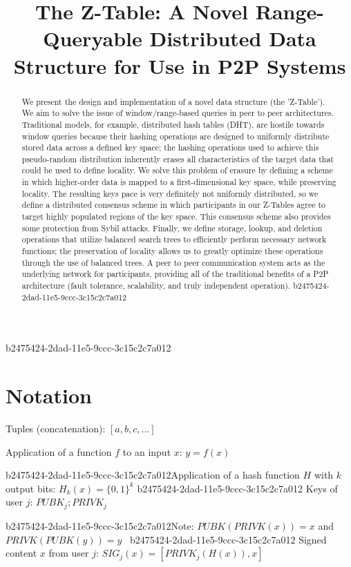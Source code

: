 \documentclass[12pt]{article}
\title{The Z-Table: A Novel Range-Queryable Distributed Data Structure for Use in P2P Systems}
\begin{document}
\maketitle
b2475424-2dad-11e5-9ccc-3c15c2c7a012
\begin{abstract}
We present the design and implementation of a novel data structure (the 'Z-Table'). We aim to solve the issue of window/range-based queries in peer to peer architectures. Traditional models, for example,  distributed hash tables (DHT), are hostile towards window queries because their hashing operations are designed to uniformly distribute stored data across a defined key space; the hashing operations used to achieve this pseudo-random distribution inherently erases all characteristics of the target data that could be used to define locality. We solve this problem of erasure by defining a scheme in which higher-order data is mapped to a first-dimensional key space, while preserving locality. The resulting keys pace is very definitely not uniformly distributed, so we define a distributed consensus scheme in which participants in our Z-Tables agree to target highly populated regions of the key space. This consensus scheme also provides some protection from Sybil attacks. Finally, we define storage, lookup, and deletion operations that utilize balanced search trees to efficiently perform necessary network functions; the preservation of locality allows us to greatly optimize these operations through the use of balanced trees. A peer to peer communication system acts as the underlying network for participants, providing all of the traditional benefits of a P2P architecture (fault tolerance, scalability, and truly independent operation).
b2475424-2dad-11e5-9ccc-3c15c2c7a012\end{abstract}

\section{Notation}

Tuples (concatenation): $[a,b,c,...]$

Application of a function $f$ to an input $x$: $y=f(x)$

b2475424-2dad-11e5-9ccc-3c15c2c7a012Application of a hash function $H$ with $k$ output bits: $H_{k}(x) = \{0,1\}^k$
b2475424-2dad-11e5-9ccc-3c15c2c7a012
Keys of user $j$: $ PUBK_j; PRIVK_j $

b2475424-2dad-11e5-9ccc-3c15c2c7a012Note: $PUBK(PRIVK(x)) = x$ and $PRIVK(PUBK(y)) = y$~
b2475424-2dad-11e5-9ccc-3c15c2c7a012
Signed content $x$ from user $j$: $SIG_j(x) = \left[ PRIVK_j( H(x) ), x \right]$
\end{document}
